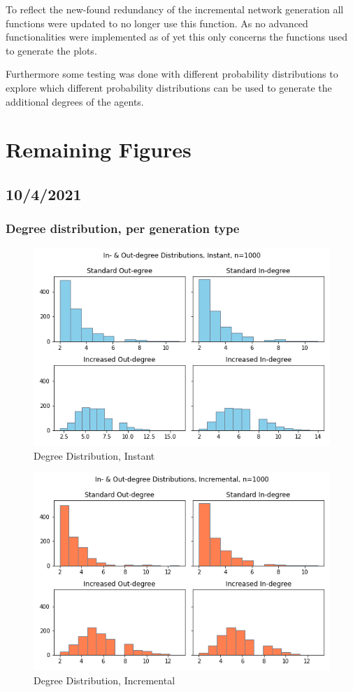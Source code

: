 \documentclass{article}
\begin{document}
To reflect the new-found redundancy of the incremental network generation all functions were updated to no longer use this function. As no advanced functionalities were implemented as of yet this only concerns the functions used to generate the plots.

Furthermore some testing was done with different probability distributions to explore which different probability distributions can be used to generate the additional degrees of the agents.

\newpage
\section{Remaining Figures}
\subsection{10/4/2021}
\subsubsection{Degree distribution, per generation type}
\begin{center}
    \begin{figure}[!htbp]
        \centering
        \includegraphics[width=.8\textwidth]{ThesisKI/Images/InstantDegree.png}
        \caption{Degree Distribution, Instant}
        \label{degree:instant}
    \end{figure}
\end{center}
\begin{center}
    \begin{figure}[!htbp]
        \centering
        \includegraphics[width=.8\textwidth]{ThesisKI/Images/IncrementalDegree.png}
        \caption{Degree Distribution, Incremental}
        \label{degree:incremental}
    \end{figure}
\end{center}
\end{document}
